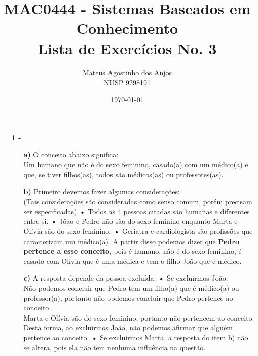 \documentclass[12pt]{article}
\title{MAC0444 - Sistemas Baseados em Conhecimento \\
Lista de Exercícios No. 3
}
\author{Mateus Agostinho dos Anjos\\NUSP 9298191}
\date{\today}
\begin{document}
	\maketitle
	\begin{itemize}
		\item[\textbf{1 -}]
			\hfill\newline
			\begin{itemize}
				\item[\textbf{a) }]
					\hfill\newline
					O conceito abaixo significa:\\
					Um humano que não é do sexo feminino, casado(a) com um médico(a) e que,
					se tiver filhos(as), todos são médicos(as) ou professores(as). 
				\item[\textbf{b) }]
					\hfill\newline
					Primeiro devemos fazer algumas considerações:\\
					(Tais considerações são consideradas como senso comum, porém
					precisam ser especificadas)
					\subitem\textbf{•}
					Todos as 4 pessoas citadas são humanas e diferentes entre si.
					\subitem\textbf{•}
					Jõao e Pedro não são do sexo feminino enquanto Marta e Olívia são do sexo feminino.
					\subitem\textbf{•}
					Geriatra e cardiologista são profissões que caracterizam um médico(a).
					\newline
					A partir disso podemos dizer que \textbf{Pedro pertence a esse conceito}, pois é humano,
					não é do sexo feminino, é casado com Olívia que é uma médica e tem o filho João que é
					médico.
					\newpage
				\item[\textbf{c) }]
					\hfill\newline
					A resposta depende da pessoa excluída:
					\newline
					\subitem\textbf{•}
					Se excluirmos João:\\
					Não podemos concluir que Pedro tem um filho(a) que é médico(a) ou
					professor(a), portanto não podemos concluir que Pedro pertence ao conceito.\\
					Marta e Olívia são do sexo feminino, portanto não pertencem ao conceito.\\
					Desta forma, ao excluirmos João, não podemos afirmar que alguém pertence ao
					conceito.
					\newline
					\subitem\textbf{•}
					Se excluirmos Marta, a resposta do item b) não se altera, pois ela não tem
					nenhuma influência na questão.
					\newline

\end{itemize}
\end{itemize}
\end{document}
